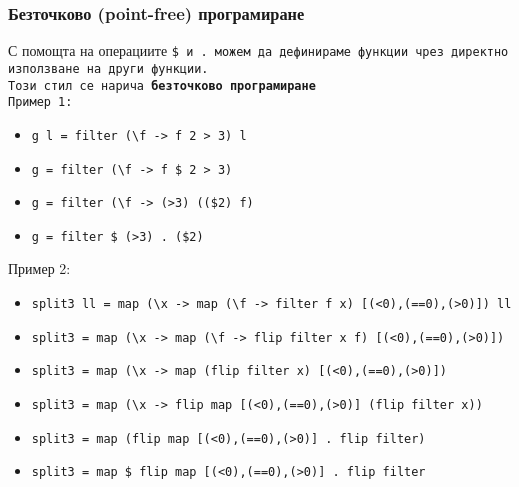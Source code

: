 \documentclass{beamer}
\begin{document}
\begin{frame}
  \frametitle{Безточково (point-free) програмиране}
  С помощта на операциите \tt{\$} и \tt. можем да дефинираме функции чрез директно използване на други функции.\\\pause
  Този стил се нарича \textbf{безточково програмиране}\\\pause
  Пример 1:
  \begin{itemize}[<+->]
    \small
  \item \tt{g l = filter (\textbackslash f -> f 2 > 3) l}
  \item \tt{g = filter (\textbackslash f -> f \$ 2 > 3)}
  \item \tt{g = filter (\textbackslash f -> (>3) ((\$2) f)}
  \item \tt{g = filter \$ (>3) . (\$2)}
  \end{itemize}
  \onslide<+->
  Пример 2:
  \begin{itemize}[<+->]
  \footnotesize
  \item \tt{split3 ll = map (\textbackslash x -> map (\textbackslash f -> filter f x)  [(<0),(==0),(>0)]) ll}
  \item \tt{split3 = map  (\textbackslash x -> map (\textbackslash f -> flip filter x f) [(<0),(==0),(>0)])}
  \item \tt{split3 = map  (\textbackslash x -> map (flip filter x) [(<0),(==0),(>0)])}
  \item \tt{split3 = map  (\textbackslash x -> flip map [(<0),(==0),(>0)] (flip filter x))}
  \item \tt{split3 = map (flip map [(<0),(==0),(>0)] . flip filter)}
  \item \tt{split3 = map \$ flip map [(<0),(==0),(>0)] . flip filter}
  \end{itemize}
\end{frame}
\end{document}
